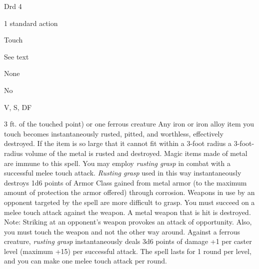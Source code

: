 
\begin{description*}
\item[Level:] Drd 4
\item[Casting Time:] 1 standard action
\item[Range:] Touch
\item[Duration:] See text
\item[Saving Throw:] None
\item[Spell Resistance:] No
\item[Components:] V, S, DF
\end{description*}

3 ft. of the touched point) or one ferrous creature
Any iron or iron alloy item you touch becomes instantaneously rusted, pitted, and
worthless, effectively destroyed. If the item is so large that it cannot fit within
a 3-foot radius a 3-foot-radius volume of the metal is rusted and destroyed. Magic
items made of metal are immune to this spell.
You may employ \textit{rusting grasp} in combat with a successful melee touch attack.
\textit{Rusting grasp} used in this way instantaneously destroys 1d6 points of
Armor Class gained from metal armor (to the maximum amount of protection the armor
offered) through corrosion.
Weapons in use by an opponent targeted by the spell are more difficult to grasp.
You must succeed on a melee touch attack against the weapon. A metal weapon that
is hit is destroyed.
Note: Striking at an opponent's weapon provokes an attack of opportunity.
Also, you must touch the weapon and not the other way around.
Against a ferrous creature, \textit{rusting grasp} instantaneously deals 3d6 points
of damage +1 per caster level (maximum +15) per successful attack. The spell lasts
for 1 round per level, and you can make one melee touch attack per round.